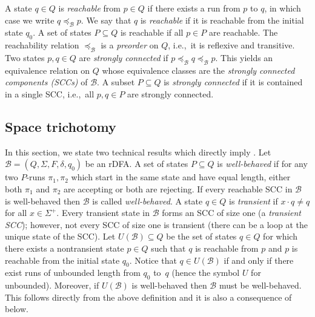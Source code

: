 \documentclass{theoretics}
\newcommand{\B}{\mathcal{B}}
\begin{document}
A state $q \in Q$ is {\em reachable} from $p \in Q$ if there exists a run from $p$ to $q$, in which case we write $q \preceq_\B p$.
We say that $q$ is {\em reachable} if it is reachable from the initial state $q_0$.
A set of states $P \subseteq Q$ is reachable if all $p \in P$ are reachable.
The reachability relation $\preceq_\B$ is a {\em preorder} on $Q$,
i.e.,~it is reflexive and transitive.
Two states $p,q \in Q$ are {\em strongly connected} if $p \preceq_\B q \preceq_\B p$.
This yields an equivalence relation on $Q$ whose equivalence classes 
 are the {\em strongly connected components (SCCs)} of $\B$.
A subset $P \subseteq Q$ is {\em strongly connected} if it is contained in a single SCC,
i.e.,~all  $p,q \in P$ are strongly connected.

\subsection{Space trichotomy}

In this section, we state two technical results which directly imply .
Let $\B = (Q,\Sigma,F,\delta,q_0)$ be an rDFA.
A set of states $P \subseteq Q$ is {\em well-behaved} if
for any two $P$-runs $\pi_1, \pi_2$ which start in the same state
and have equal length, either both $\pi_1$ and $\pi_2$ are accepting or both are rejecting.
If every reachable SCC in $\B$ is well-behaved then $\B$ is called {\em well-behaved}.
A state $q \in Q$ is {\em transient} if $x \cdot q \neq q$ for all $x \in \Sigma^+$.
Every transient state in $\B$ forms an SCC of size one (a {\em transient SCC});
however, not every SCC of size one is transient (there can be a loop at the unique state of the SCC).
Let $U(\B) \subseteq Q$ be the set of states $q \in Q$ for which there exists a nontransient state $p \in Q$
such that $q$ is reachable from $p$ and $p$ is reachable from the initial state $q_0$.
Notice that $q \in U(\B)$ if and only if there exist runs of unbounded length from $q_0$ to~$q$
(hence the symbol $U$ for unbounded). Moreover, if $U(\B)$ is well-behaved then $\B$ must be well-behaved.
This follows directly from the above definition and it is also a consequence of  below.
\end{document}

